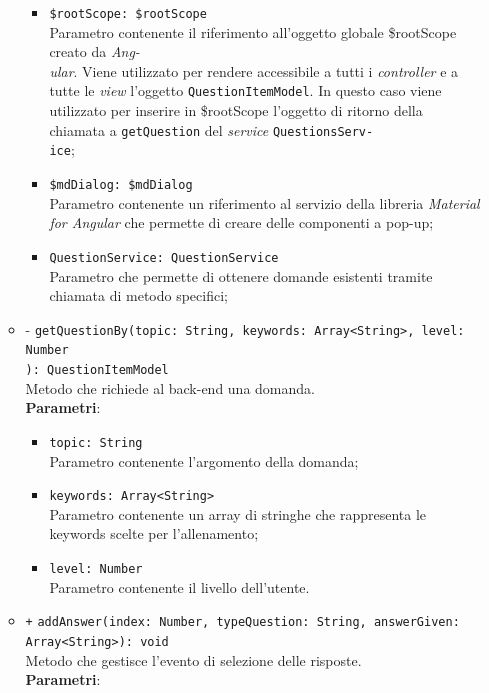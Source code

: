 \begin{itemize}
\begin{itemize}
\begin{itemize}
			\item \texttt{\$rootScope: \$rootScope} \\
			Parametro contenente il riferimento all'oggetto globale \$rootScope creato da \textit{Ang-\\ular{}}. Viene utilizzato per rendere accessibile a tutti i \textit{controller} e a tutte le \textit{view} l'oggetto \texttt{QuestionItemModel}. In questo caso viene utilizzato per inserire in \$rootScope l'oggetto di ritorno della chiamata a \texttt{getQuestion} del \textit{service} \texttt{QuestionsServ-\\ice}; 
			\item \texttt{\$mdDialog: \$mdDialog} \\
			Parametro contenente un riferimento al servizio della libreria \textit{Material for Angular} che permette di creare delle componenti a pop-up;
			\item \texttt{QuestionService: QuestionService} \\ Parametro che permette di ottenere domande esistenti tramite chiamata di metodo specifici;
		\end{itemize}
		\item {-} \texttt{getQuestionBy(topic: String, keywords: Array<String>, level: Number\\): QuestionItemModel} \\ Metodo che richiede al back-end una domanda. \\
		\textbf{Parametri}:
		\begin{itemize}
			\item \texttt{topic: String} \\
			Parametro contenente l'argomento della domanda;
			\item \texttt{keywords: Array<String>} \\
			Parametro contenente un array di stringhe che rappresenta le keywords scelte per l'allenamento;
			\item \texttt{level: Number} \\
			Parametro contenente il livello dell'utente.
		\end{itemize}
		\item \texttt{+} \texttt{addAnswer(index: Number, typeQuestion: String, answerGiven: \\Array<String>): void} \\
		Metodo che gestisce l'evento di selezione delle risposte. \\
		\textbf{Parametri}:
		\begin{itemize}

\end{itemize}
\end{itemize}
\end{itemize}
